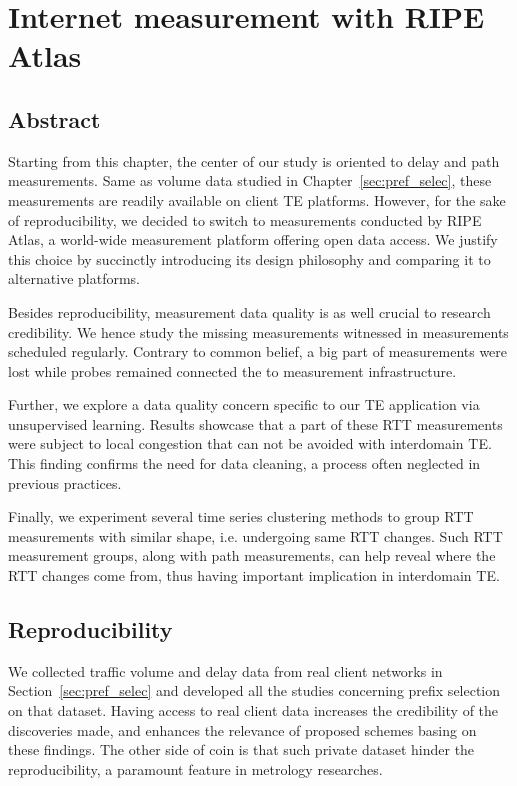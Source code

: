 \chapter{Internet measurement with RIPE Atlas}
\label{sec:ripe_atlas}
\section*{Abstract}

Starting from this chapter, the center of our study is oriented to delay and path measurements.
Same as volume data studied in Chapter~\ref{sec:pref_selec}, these measurements are readily available on client TE platforms.
However, for the sake of reproducibility, we decided to switch to measurements conducted by RIPE Atlas, a world-wide measurement platform offering open data access. We justify this choice by succinctly introducing its design philosophy and comparing it to alternative platforms.


Besides reproducibility, measurement data quality is as well crucial to research credibility.
We hence study the missing measurements witnessed in measurements scheduled regularly. Contrary to common belief, a big part of measurements were lost while probes remained connected the to measurement infrastructure.

Further, we explore a data quality concern specific to our TE application via unsupervised learning.
Results showcase that a part of these RTT measurements were subject to local congestion that can not be avoided with interdomain TE. This finding confirms the need for data cleaning, a process often neglected in previous practices.

Finally, we experiment several time series clustering methods to group RTT measurements with similar shape, i.e. undergoing same RTT changes.
Such RTT measurement groups, along with path measurements, can help reveal where the RTT changes come from, thus having important implication in interdomain TE.
\clearpage

\section{Reproducibility}
We collected traffic volume and delay data from real client networks in Section~\ref{sec:pref_selec} and developed all the studies concerning prefix selection on that dataset.
Having access to real client data increases the credibility of the discoveries made, and enhances the relevance of proposed schemes basing on these findings.
The other side of coin is that such private dataset hinder the reproducibility, a paramount feature in metrology researches.

